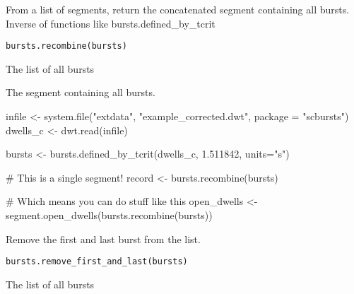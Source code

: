 \documentclass[letterpaper]{book}
\begin{document}
%
\begin{Description}\relax
From a list of segments, return the concatenated  segment containing all bursts. Inverse of functions like bursts.defined\_by\_tcrit
\end{Description}
%
\begin{Usage}
\begin{verbatim}
bursts.recombine(bursts)
\end{verbatim}
\end{Usage}
%
\begin{Arguments}
\begin{ldescription}
\item[\code{bursts}] The list of all bursts
\end{ldescription}
\end{Arguments}
%
\begin{Value}
The segment containing all bursts.
\end{Value}
%
\begin{Examples}
\begin{ExampleCode}

infile <- system.file("extdata", "example_corrected.dwt", package = "scbursts")
dwells_c <- dwt.read(infile)

bursts <- bursts.defined_by_tcrit(dwells_c, 1.511842, units="s")

# This is a single segment!
record <- bursts.recombine(bursts)

# Which means you can do stuff like this
open_dwells <- segment.open_dwells(bursts.recombine(bursts))

\end{ExampleCode}
\end{Examples}
%
\begin{Description}\relax
Remove the first and last burst from the list.
\end{Description}
%
\begin{Usage}
\begin{verbatim}
bursts.remove_first_and_last(bursts)
\end{verbatim}
\end{Usage}
%
\begin{Arguments}
\begin{ldescription}
\item[\code{bursts}] The list of all bursts
\end{ldescription}
\end{Arguments}
\end{document}
